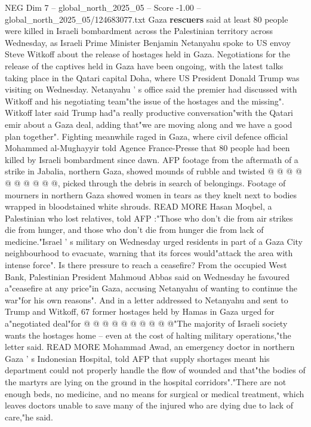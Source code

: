 \begin{textsample}{NEG Dim 7 – global\_north\_2025\_05 – Score -1.00 – global\_north\_2025\_05/124683077.txt}  \label{ex:f7_neg_125}
Gaza \textbf{rescuers} said at least 80 people were killed in Israeli bombardment across the Palestinian territory across Wednesday, as Israeli Prime Minister Benjamin Netanyahu spoke to US envoy Steve Witkoff about the release of hostages held in Gaza.
Negotiations for the release of the captives held in Gaza have been ongoing, with the latest talks taking place in the Qatari capital Doha, where US President Donald Trump was visiting on Wednesday.
Netanyahu ' s office said the premier had discussed with Witkoff and his negotiating team"the issue of the hostages and the missing".
Witkoff later said Trump had"a really productive conversation"with the Qatari emir about a Gaza deal, adding that"we are moving along and we have a good plan together".
Fighting meanwhile raged in Gaza, where civil defence official Mohammed al-Mughayyir told Agence France-Presse that 80 people had been killed by Israeli bombardment since dawn.
AFP footage from the aftermath of a strike in Jabalia, northern Gaza, showed mounds of rubble and twisted @ @ @ @ @ @ @ @ @ @, picked through the debris in search of belongings.
Footage of mourners in northern Gaza showed women in tears as they knelt next to bodies wrapped in bloodstained white shrouds.
READ MORE Hasan Moqbel, a Palestinian who lost relatives, told AFP :"Those who don't die from air strikes die from hunger, and those who don't die from hunger die from lack of medicine."Israel ' s military on Wednesday urged residents in part of a Gaza City neighbourhood to evacuate, warning that its forces would"attack the area with intense force".
Is there pressure to reach a ceasefire?
From the occupied West Bank, Palestinian President Mahmoud Abbas said on Wednesday he favoured a"ceasefire at any price"in Gaza, accusing Netanyahu of wanting to continue the war"for his own reasons".
And in a letter addressed to Netanyahu and sent to Trump and Witkoff, 67 former hostages held by Hamas in Gaza urged for a"negotiated deal"for @ @ @ @ @ @ @ @ @ @"The majority of Israeli society wants the hostages home -- even at the cost of halting military operations,"the letter said.
READ MORE Mohammad Awad, an emergency doctor in northern Gaza ' s Indonesian Hospital, told AFP that supply shortages meant his department could not properly handle the flow of wounded and that"the bodies of the martyrs are lying on the ground in the hospital corridors"."There are not enough beds, no medicine, and no means for surgical or medical treatment, which leaves doctors unable to save many of the injured who are dying due to lack of care,"he said.

\end{textsample}

